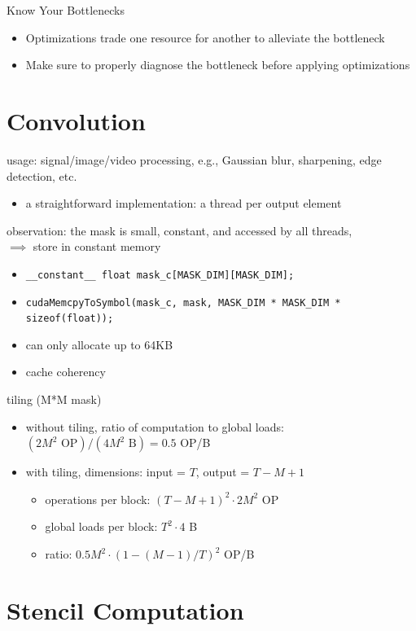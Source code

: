 \documentclass{article}
\begin{document}
Know Your Bottlenecks

\begin{itemize}
\item Optimizations trade one resource for another to alleviate the bottleneck
\item Make sure to properly diagnose the bottleneck before applying optimizations
\end{itemize}

\section{Convolution}

usage: signal/image/video processing, e.g., Gaussian blur, sharpening, edge detection, etc.
\begin{itemize}
\item a straightforward implementation: a thread per output element
\end{itemize}
observation: the mask is small, constant, and accessed by all threads,\\
$\implies$ store in constant memory
\begin{itemize}
\item \texttt{\_\_constant\_\_ float mask\_c[MASK\_DIM][MASK\_DIM];}
\item \texttt{cudaMemcpyToSymbol(mask\_c, mask, MASK\_DIM * MASK\_DIM * sizeof(float));}
\item can only allocate up to 64KB
\item cache coherency
\end{itemize}
tiling (M*M mask)
\begin{itemize}
\item without tiling, ratio of computation to global loads: $(2M^2 \text{ OP}) / (4M^2 \text{ B}) = 0.5$ OP/B
\item with tiling, dimensions: input = $T$, output = $T-M+1$
\begin{itemize}
\item operations per block: $(T-M+1)^2 \cdot 2M^2$ OP
\item global loads per block: $T^2 \cdot 4$ B
\item ratio: $0.5M^2 \cdot (1 - (M-1)/T)^2$ OP/B
\end{itemize}
\end{itemize}

\section{Stencil Computation}
\end{document}
